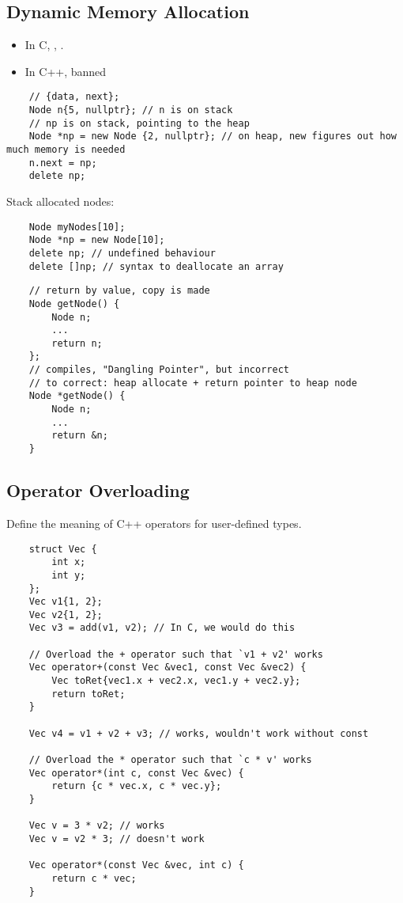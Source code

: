 \subsection{Dynamic Memory Allocation}
\begin{itemize}
    \item In C, , .
    \item In C++,  \textrightarrow{} banned
\end{itemize}
\begin{lstlisting}
    // {data, next};
    Node n{5, nullptr}; // n is on stack
    // np is on stack, pointing to the heap
    Node *np = new Node {2, nullptr}; // on heap, new figures out how much memory is needed
    n.next = np;
    delete np;
\end{lstlisting}
Stack allocated nodes:
\begin{lstlisting}
    Node myNodes[10];
    Node *np = new Node[10];
    delete np; // undefined behaviour
    delete []np; // syntax to deallocate an array
\end{lstlisting}
\begin{lstlisting}
    // return by value, copy is made
    Node getNode() {
        Node n;
        ...
        return n;
    };
    // compiles, "Dangling Pointer", but incorrect
    // to correct: heap allocate + return pointer to heap node
    Node *getNode() {
        Node n;
        ...
        return &n;
    }
\end{lstlisting}

\subsection{Operator Overloading}
Define the meaning of C++ operators for user-defined types.
\begin{lstlisting}
    struct Vec {
        int x;
        int y;
    };
    Vec v1{1, 2};
    Vec v2{1, 2};
    Vec v3 = add(v1, v2); // In C, we would do this

    // Overload the + operator such that `v1 + v2' works
    Vec operator+(const Vec &vec1, const Vec &vec2) {
        Vec toRet{vec1.x + vec2.x, vec1.y + vec2.y};
        return toRet;
    }

    Vec v4 = v1 + v2 + v3; // works, wouldn't work without const
    
    // Overload the * operator such that `c * v' works
    Vec operator*(int c, const Vec &vec) {
        return {c * vec.x, c * vec.y};
    }

    Vec v = 3 * v2; // works
    Vec v = v2 * 3; // doesn't work
    
    Vec operator*(const Vec &vec, int c) {
        return c * vec;
    }
\end{lstlisting}


